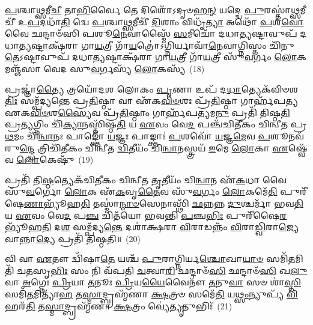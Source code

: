 \-\ul{𑌪}\-𑌶𑍍𑌚𑌾\-\ul{𑌥𑍍𑌸}\-𑌮𑍀\-\ul{𑌚𑍀} 𑌤𑌾\-\ul{𑌭𑌿}\-𑌰𑍍𑌵𑍈 𑌤𑍇 𑌦𑌿𑌶𑍋᳴\-𑌽𑌦𑍃𑍞\-\ul{𑌹}\-\-\ul{𑌨𑍍} 𑌯𑌦𑍍𑌦𑍍𑌵𑍇 \ul{𑌪𑍁}\-𑌰𑌸𑍍𑌤𑌾॑\-\ul{𑌥𑍍𑌸}\-𑌮𑍀𑌚𑍀᳴ 𑌉\-\ul{𑌪}\-𑌦𑌧𑌾᳴\-\ul{𑌤𑌿} 𑌦𑍍𑌵𑍇 \ul{𑌪}\-𑌶𑍍𑌚𑌾\-\ul{𑌥𑍍𑌸}\-𑌮𑍀𑌚𑍀᳴ \ul{𑌦𑌿}\-𑌶𑌾𑌂 𑌵𑌿𑌧𑍃᳴\-\ul{𑌤𑍍𑌯𑌾} 𑌅𑌥𑍋᳴ \ul{𑌪}\-𑌶\-\ul{𑌵𑍋} 𑌵𑍈 𑌛𑌨𑍍𑌦𑌾𑍞᳴𑌸𑌿 𑌪𑌶𑍂\-\ul{𑌨𑍇}\-𑌵𑌾𑌸𑍍𑌮𑍈᳴ \ul{𑌸}\-𑌮𑍀𑌚𑍋᳴ 𑌦𑌧𑌾\-\ul{𑌤𑍍𑌯}\-𑌷𑍍𑌟𑌾𑌵𑍁𑌪᳴ 𑌦𑌧𑌾\-\ul{𑌤𑍍𑌯}\-𑌷𑍍𑌟𑌾𑌕𑍍𑌷᳴𑌰𑌾 𑌗𑌾\-\ul{𑌯}\-𑌤𑍍𑌰𑍀 𑌗𑌾᳴\-\ul{𑌯}\-𑌤𑍍𑌰𑍋॑\-𑌽𑌗𑍍𑌨𑌿𑌰𑍍𑌯𑌾𑌵𑌾᳴\-\ul{𑌨𑍇}\-𑌵𑌾𑌗𑍍𑌨𑌿𑌸𑍍𑌤𑌂 𑌚𑌿᳴𑌨𑍁\-\ul{𑌤𑍇}\-\-𑌽𑌷𑍍𑌟𑌾𑌵𑍁𑌪᳴ 𑌦𑌧𑌾\-\ul{𑌤𑍍𑌯}\-𑌷𑍍𑌟𑌾𑌕𑍍𑌷᳴𑌰𑌾 𑌗𑌾\-\ul{𑌯}\-𑌤𑍍𑌰𑍀 𑌗𑌾᳴\-\ul{𑌯}\-𑌤𑍍𑌰𑍀 𑌸𑍁᳴\-\ul{𑌵}\-𑌰𑍍𑌗𑌂 \ul{𑌲𑍋}\-𑌕𑌮𑌞𑍍𑌜᳴𑌸𑌾 𑌵𑍇𑌦 𑌸𑍁\-\ul{𑌵}\-𑌰𑍍𑌗𑌸𑍍𑌯᳴ \ul{𑌲𑍋}\-𑌕𑌸𑍍𑌯᳴~(18)

𑌪𑍍𑌰𑌜𑍍𑌞𑌾॑\-\ul{𑌤𑍍𑌯𑍈} 𑌤𑍍𑌰𑌯𑍋᳴𑌦𑌶 𑌲𑍋𑌕𑌂 \ul{𑌪𑍃}\-𑌣𑌾 𑌉𑌪᳴ 𑌦\-\ul{𑌧𑌾}\-𑌤𑍍𑌯𑍇𑌕᳴𑌵𑌿𑍞𑌶\-\ul{𑌤𑌿𑌃} 𑌸𑌮𑍍𑌪᳴𑌦𑍍𑌯𑌨𑍍𑌤𑍇 𑌪𑍍𑌰\-\ul{𑌤𑌿}\-𑌷𑍍𑌠𑌾 𑌵𑌾 𑌏᳴𑌕\-\ul{𑌵𑌿}\-\-\ul{𑍞}\-𑌶𑌃 𑌪𑍍𑌰᳴\-\ul{𑌤𑌿}\-𑌷𑍍𑌠𑌾 𑌗𑌾𑌰𑍍\mbox{}𑌹᳴𑌪𑌤𑍍𑌯 𑌏𑌕\-\ul{𑌵𑌿}\-\-\ul{𑍞}\-𑌶\-\ul{𑌸𑍍𑌯𑍈}\-𑌵 𑌪𑍍𑌰᳴\-\ul{𑌤𑌿}\-𑌷𑍍𑌠𑌾𑌂 𑌗𑌾𑌰𑍍\mbox{}𑌹᳴𑌪\-\ul{𑌤𑍍𑌯}\-𑌮\-\ul{𑌨𑍁} 𑌪𑍍𑌰𑌤𑌿᳴ 𑌤𑌿𑌷𑍍𑌠\-\ul{𑌤𑌿} 𑌪𑍍𑌰\-\ul{𑌤𑍍𑌯}\-𑌗𑍍𑌨𑌿𑌂 𑌚𑌿᳴\-\ul{𑌕𑍍𑌯𑌾}\-𑌨𑌸𑍍𑌤𑌿᳴𑌷𑍍𑌠\-\ul{𑌤𑌿} 𑌯 \ul{𑌏}\-𑌵𑌂 𑌵𑍇\-\ul{𑌦} 𑌪𑌞𑍍𑌚᳴𑌚𑌿𑌤𑍀𑌕𑌂 𑌚𑌿𑌨𑍍𑌵𑍀𑌤 𑌪𑍍𑌰\-\ul{𑌥}\-𑌮𑌂 𑌚𑌿᳴\-\ul{𑌨𑍍𑌵𑌾}\-𑌨𑌃 𑌪𑌾𑌙𑍍𑌕𑍍𑌤𑍋᳴ \ul{𑌯}\-𑌜𑍍𑌞𑌃 𑌪𑌾𑌙𑍍𑌕𑍍𑌤𑌾𑌃॑ \ul{𑌪}\-𑌶𑌵𑍋᳴ \ul{𑌯}\-𑌜𑍍𑌞\-\ul{𑌮𑍇}\-𑌵 \ul{𑌪}\-𑌶𑍂𑌨𑌵᳴ 𑌰𑍁\-\ul{𑌨𑍍𑌦𑍍𑌧𑍇} 𑌤𑍍𑌰𑌿𑌚𑌿᳴𑌤𑍀𑌕𑌂 𑌚𑌿𑌨𑍍𑌵𑍀𑌤 \ul{𑌦𑍍𑌵𑌿}\-𑌤𑍀𑌯𑌂᳴ 𑌚𑌿\-\ul{𑌨𑍍𑌵𑌾}\-𑌨𑌸𑍍𑌤𑍍𑌰𑌯᳴ \ul{𑌇}\-𑌮𑍇 \ul{𑌲𑍋}\-𑌕𑌾 \ul{𑌏}\-𑌷𑍍𑌵𑍇᳴𑌵 \ul{𑌲𑍋}\-𑌕𑍇𑌷𑍁᳴~(19)

𑌪𑍍𑌰𑌤𑌿᳴ 𑌤𑌿\-\ul{𑌷𑍍𑌠}\-𑌤𑍍𑌯𑍇𑌕᳴𑌚𑌿𑌤𑍀𑌕𑌂 𑌚𑌿𑌨𑍍𑌵𑍀𑌤 \ul{𑌤𑍃}\-𑌤𑍀𑌯𑌂᳴ 𑌚𑌿\-\ul{𑌨𑍍𑌵𑌾}\-𑌨 𑌏᳴\-\ul{𑌕}\-𑌧𑌾 𑌵𑍈 𑌸𑍁᳴\-\ul{𑌵}\-𑌰𑍍𑌗𑍋 \ul{𑌲𑍋}\-𑌕 𑌏᳴\-\ul{𑌕}\-𑌵𑍃\-\ul{𑌤𑍈}\-𑌵 𑌸𑍁᳴\-\ul{𑌵}\-𑌰𑍍𑌗𑌂 \ul{𑌲𑍋}\-𑌕𑌮𑍇᳴\-\ul{𑌤𑌿} 𑌪𑍁𑌰𑍀᳴𑌷𑍇\-\ul{𑌣𑌾}\-𑌭𑍍𑌯𑍂᳴𑌹\-\ul{𑌤𑌿} 𑌤𑌸𑍍𑌮𑌾॑\-\ul{𑌨𑍍𑌮𑌾}\-\-\ul{𑍞}\-𑌸𑍇𑌨𑌾𑌸𑍍𑌥𑌿᳴ \ul{𑌛}\-𑌨𑍍𑌨𑌨𑍍𑌨 \ul{𑌦𑍁}\-𑌶𑍍𑌚𑌰𑍍𑌮𑌾᳴ 𑌭𑌵\-\ul{𑌤𑌿} 𑌯 \ul{𑌏}\-𑌵𑌂 𑌵𑍇\-\ul{𑌦} 𑌪\-\ul{𑌞𑍍𑌚} 𑌚𑌿𑌤᳴𑌯𑍋 𑌭𑌵𑌨𑍍𑌤𑌿 \ul{𑌪}\-𑌞𑍍𑌚\-\ul{𑌭𑌿𑌃} 𑌪𑍁𑌰𑍀᳴𑌷𑍈\-\ul{𑌰}\-𑌭𑍍𑌯𑍂᳴𑌹\-\ul{𑌤𑌿} 𑌦\-\ul{𑌶} 𑌸𑌮𑍍𑌪᳴𑌦𑍍𑌯\-\ul{𑌨𑍍𑌤𑍇} 𑌦𑌶𑌾॑𑌕𑍍𑌷𑌰𑌾 \ul{𑌵𑌿}\-𑌰𑌾𑌡𑌨𑍍𑌨𑌂᳴ \ul{𑌵𑌿}\-𑌰𑌾\-\ul{𑌡𑍍𑌵𑌿}\-𑌰𑌾\-\ul{𑌜𑍍𑌯𑍇}\-𑌵𑌾𑌨𑍍𑌨𑌾\-\ul{𑌦𑍍𑌯𑍇} 𑌪𑍍𑌰𑌤𑌿᳴ 𑌤𑌿𑌷𑍍𑌠𑌤𑌿॥~(20)

{\anuvakamend[{\-\ul{𑌅}\-\-\ul{𑌦𑍍𑌧𑍍𑌯}\-\-\ul{𑌵}\-\-\ul{𑌸𑌾}\-𑌯𑌯᳴\-\ul{𑌤𑌿} 𑌹𑍍𑌯𑍇᳴𑌤\-\ul{𑌦𑍍𑌵𑌿}\-𑌶𑍍𑌵𑌾𑌮𑌿᳴𑌤𑍍𑌰𑌸𑍍𑌯𑌾𑌦𑌧\-\ul{𑌤} 𑌦𑍍𑌵𑍇 \ul{𑌲𑍋}\-𑌕𑌸𑍍𑌯᳴ \ul{𑌲𑍋}\-𑌕𑍇𑌷𑍁᳴ \ul{𑌸}\-𑌪𑍍𑌤𑌚᳴𑌤𑍍𑌵𑌾𑌰𑌿𑍞𑌶𑌚𑍍𑌚}]}%

𑌵𑌿 𑌵𑌾 \ul{𑌏}\-𑌤𑍗 𑌦𑍍𑌵𑌿᳴𑌷𑌾\-\ul{𑌤𑍇} 𑌯𑌶𑍍𑌚᳴ \ul{𑌪𑍁}\-𑌰𑌾𑌗𑍍𑌨𑌿𑌰𑍍𑌯\-\ul{𑌶𑍍𑌚𑍋}\-𑌖𑌾\-\ul{𑌯𑌾}\-\-\ul{𑍞} 𑌸𑌮𑌿᳴\-\ul{𑌤}\-𑌮𑌿𑌤𑌿᳴ 𑌚\-\ul{𑌤}\-𑌸𑍃\-\ul{𑌭𑌿𑌃} 𑌸𑌂 𑌨𑌿 𑌵᳴𑌪𑌤𑌿 \ul{𑌚}\-𑌤𑍍𑌵𑌾\-\ul{𑌰𑌿} 𑌛𑌨𑍍𑌦𑌾𑍞᳴\-\ul{𑌸𑌿} 𑌛𑌨𑍍𑌦𑌾𑍞᳴\-\ul{𑌸𑌿} 𑌖\-\ul{𑌲𑍁} 𑌵𑌾 \ul{𑌅}\-𑌗𑍍𑌨𑍇𑌃 \ul{𑌪𑍍𑌰𑌿}\-𑌯𑌾 \ul{𑌤}\-𑌨𑍂𑌃 \ul{𑌪𑍍𑌰𑌿}\-𑌯\-\ul{𑌯𑍈}\-𑌵𑍈𑌨𑍗᳴ \ul{𑌤}\-𑌨𑍁\-\ul{𑌵𑌾} 𑌸𑍞 𑌶𑌾॑\-\ul{𑌸𑍍𑌤𑌿} 𑌸𑌮𑌿᳴\-\ul{𑌤}\-𑌮𑌿𑌤𑍍𑌯𑌾᳴\-\ul{𑌹} 𑌤\-\ul{𑌸𑍍𑌮𑌾}\-𑌦𑍍𑌬𑍍𑌰𑌹𑍍𑌮᳴𑌣𑌾 \ul{𑌕𑍍𑌷}\-𑌤𑍍𑌰𑍞 𑌸𑌮𑍇᳴\-\ul{𑌤𑌿} 𑌯\-\ul{𑌥𑍍𑌸𑌂}\-𑌨𑍍𑌯𑍁𑌪𑍍𑌯᳴ \ul{𑌵𑌿}\-𑌹𑌰᳴\-\ul{𑌤𑌿} 𑌤\-\ul{𑌸𑍍𑌮𑌾}\-𑌦𑍍𑌬𑍍𑌰𑌹𑍍𑌮᳴𑌣𑌾 \ul{𑌕𑍍𑌷}\-𑌤𑍍𑌰𑌂 𑌵𑍍𑌯𑍇॑\-\ul{𑌤𑍍𑌯𑍃}\-𑌤𑍁𑌭𑌿𑌃᳴~(21)

